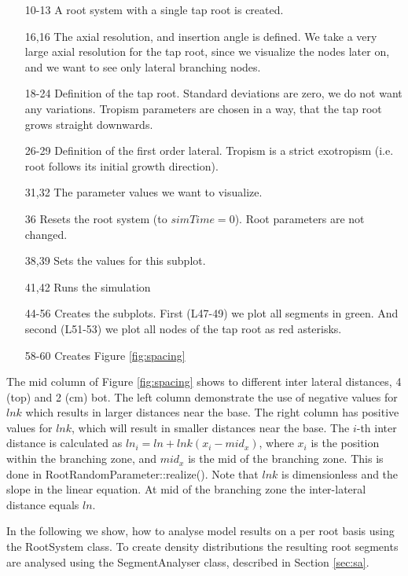 

\begin{itemize}
\item[10-13] A root system with a single tap root is created. 
\item[16,16] The axial resolution, and insertion angle is defined. We take a very large axial resolution for the tap root, since we visualize the nodes later on, and we want to see only lateral branching nodes.
\item[18-24] Definition of the tap root. Standard deviations are zero, we do not want any variations. Tropism parameters are chosen in a way, that the tap root grows straight downwards.
\item[26-29] Definition of the first order lateral. Tropism is a strict exotropism (i.e. root follows its initial growth direction).
\item[31,32] The parameter values we want to visualize.
\item[36] Resets the root system (to $simTime = 0$). Root parameters are not changed. 
\item[38,39] Sets the values for this subplot. 
\item[41,42] Runs the simulation
\item[44-56] Creates the subplots. First (L47-49) we plot all segments in green. And second (L51-53) we plot all nodes of the tap root as red asterisks.
\item[58-60] Creates Figure \ref{fig:spacing}
\end{itemize}

The mid column of Figure \ref{fig:spacing} shows to different inter lateral distances, 4 (top) and 2 (cm) bot. The left column demonstrate the use of negative values for $lnk$ which results in larger distances near the base. The right column has positive values for $lnk$, which will result in smaller distances near the base. The $i$-th inter distance is calculated as $ln_i = ln + lnk (x_i-mid_x)$, where $x_i$ is the position within the branching zone, and $mid_x$ is the mid of the branching zone. This is done in RootRandomParameter::realize(). Note that $lnk$ is dimensionless and the slope in the linear equation. At mid of the branching zone the inter-lateral distance equals $ln$. 


In the following we show, how to analyse model results on a per root basis using the RootSystem class. To create density distributions the resulting root segments are analysed using the SegmentAnalyser class, described in Section \ref{sec:sa}.






